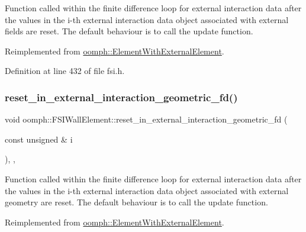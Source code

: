 Function called within the finite difference loop for external interaction data after the values in the i-\/th external interaction data object associated with external fields are reset. The default behaviour is to call the update function. 



Reimplemented from \hyperlink{classoomph_1_1ElementWithExternalElement_a4ee53afaf9a09c5e2e5cbc488ca7cd7f}{oomph\+::\+Element\+With\+External\+Element}.



Definition at line 432 of file fsi.\+h.

\mbox{\label{classoomph_1_1FSIWallElement_aa0b511d7c276578c95d26550576a9be0}} 
\subsubsection{\texorpdfstring{reset\+\_\+in\+\_\+external\+\_\+interaction\+\_\+geometric\+\_\+fd()}{reset\_in\_external\_interaction\_geometric\_fd()}}
{\footnotesize\ttfamily void oomph\+::\+F\+S\+I\+Wall\+Element\+::reset\+\_\+in\+\_\+external\+\_\+interaction\+\_\+geometric\+\_\+fd (\begin{DoxyParamCaption}\item[{const unsigned \&}]{i }\end{DoxyParamCaption})\hspace{0.3cm}{\ttfamily [inline]}, {\ttfamily [protected]}, {\ttfamily [virtual]}}



Function called within the finite difference loop for external interaction data after the values in the i-\/th external interaction data object associated with external geometry are reset. The default behaviour is to call the update function. 



Reimplemented from \hyperlink{classoomph_1_1ElementWithExternalElement_a2bc7a069b01795d9c8036fb81e8b319d}{oomph\+::\+Element\+With\+External\+Element}.



